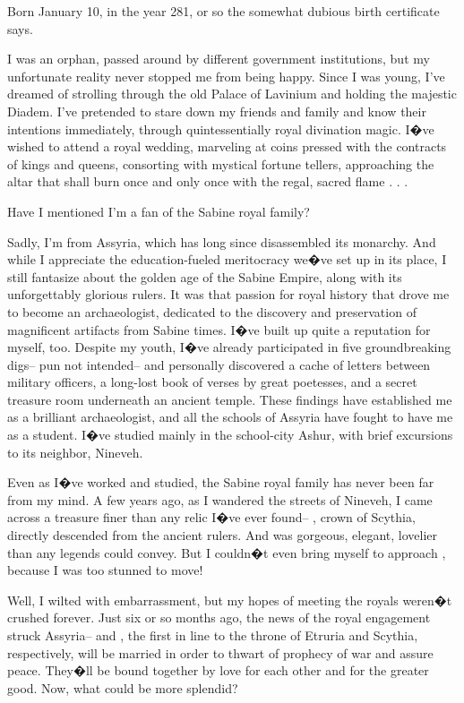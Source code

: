 \documentclass[char]{Kos}
\begin{document}
\name{\cArcheologist{}}

Born January 10, in the year 281, or so the somewhat dubious birth certificate says.

I was an orphan, passed around by different government institutions, but my unfortunate reality never stopped me from being happy. Since I was young, I've dreamed of strolling through the old Palace of Lavinium and holding the majestic Diadem. I've pretended to stare down my friends and family and know their intentions immediately, through quintessentially royal divination magic. I�ve wished to attend a royal wedding, marveling at coins pressed with the contracts of kings and queens, consorting with mystical fortune tellers, approaching the altar that shall burn once and only once with the regal, sacred flame . . .

Have I mentioned I'm a fan of the Sabine royal family?

Sadly, I'm from Assyria, which has long since disassembled its monarchy. And while I appreciate the education-fueled meritocracy we�ve set up in its place, I still fantasize about the golden age of the Sabine Empire, along with its unforgettably glorious rulers. It was that passion for royal history that drove me to become an archaeologist, dedicated to the discovery and preservation of magnificent artifacts from Sabine times. I�ve built up quite a reputation for myself, too. Despite my youth, I�ve already participated in five groundbreaking digs-- pun not intended-- and personally discovered a cache of letters between military officers, a long-lost book of verses by great poetesses, and a secret treasure room underneath an ancient temple. These findings have established me as a brilliant archaeologist, and all the schools of Assyria have fought to have me as a student. I�ve studied mainly in the school-city Ashur, with brief excursions to its neighbor, Nineveh.

Even as I�ve worked and studied, the Sabine royal family has never been far from my mind. A few years ago, as I wandered the streets of Nineveh, I came across a treasure finer than any relic I�ve ever found-- \cBride{\name}, crown \cBride{\prince} of Scythia, directly descended from the ancient rulers. And \cBride{\they} was gorgeous, elegant, lovelier than any legends could convey. But I couldn�t even bring myself to approach \cBride{\them}, because I was too stunned to move!

Well, I wilted with embarrassment, but my hopes of meeting the royals weren�t crushed forever. Just six or so months ago, the news of the royal engagement struck Assyria-- \cBride{\nickname} and \cGroom{\name}, the first in line to the throne of Etruria and Scythia, respectively, will be married in order to thwart of prophecy of war and assure peace. They�ll be bound together by love for each other and for the greater good. Now, what could be more splendid?
\end{document}
